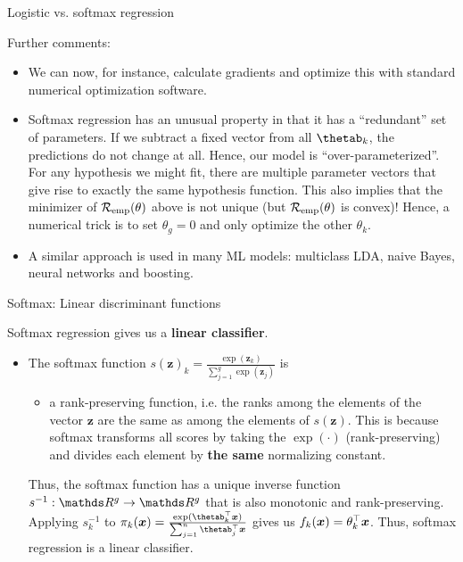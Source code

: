 \begin{vbframe}{Logistic vs. softmax regression}

Further comments:

\begin{itemize}

\item We can now, for instance, calculate gradients and optimize this with standard numerical optimization software.


\item Softmax regression has an unusual property in that it has a \enquote{redundant} set of parameters. If we subtract a fixed vector
  from all $\thetab_k$, the predictions do not change at all.
  Hence,  our model is \enquote{over-parameterized}. For any hypothesis we might fit,
  there are multiple parameter vectors that give rise to exactly the same hypothesis function.
  This also implies that the minimizer of $\mathcal{R}_{\text{emp}}(\theta)$ above is not unique (but $\mathcal{R}_{\text{emp}}(\theta)$ is convex)!
  Hence, a numerical trick is to set $\theta_g = 0$ and only optimize the other $\theta_k$.

\item A similar approach is used in many ML models: multiclass LDA, naive Bayes, neural networks and boosting.

\end{itemize}

\end{vbframe} 

\begin{vbframe}{Softmax: Linear discriminant functions}

Softmax regression gives us a \textbf{linear classifier}. 

\begin{itemize}
  \item The softmax function $s(\bm{z})_k = \frac{\exp(\bm{z}_k)}{\sum_{j = 1}^g \exp \left(\bm{z}_j\right)}$ is 

\begin{itemize}
  \item a rank-preserving function, i.e.  the ranks among the elements of the vector $\bm{z}$ are the same as among the elements of $s(\bm{z})$. This is because softmax transforms all scores by taking the $\exp(\cdot)$ (rank-preserving) and divides each element by \textbf{the same} normalizing constant. 
\end{itemize}

Thus, the softmax function has a unique inverse function $s^{-1}: \R^g \to \R^g$ that is also monotonic and rank-preserving. Applying $s_k^{-1}$ to $\pi_k(\xv) = \frac{\exp(\thetab_k^\top \xv)}{\sum_{j = 1}^n \thetab_j^\top \xv}$ gives us $f_k(\bm{x}) = \theta_k^\top \bm{x}$. Thus, softmax regression is a linear classifier. 
\end{itemize}

\end{vbframe}

